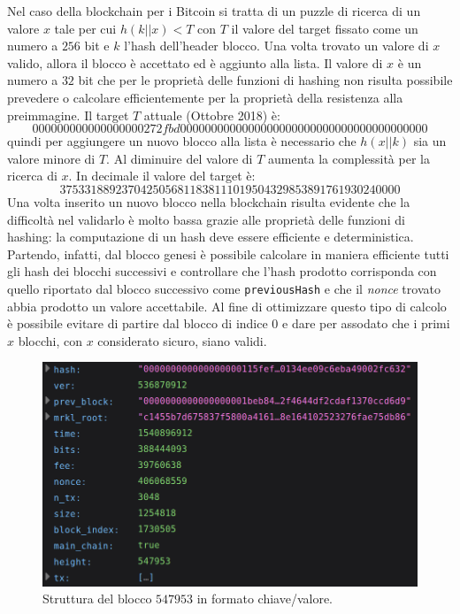 \begin{enumerate}[1.]
Nel caso della blockchain per i Bitcoin si tratta di un puzzle di ricerca di un valore $x$ tale per cui $h(k||x)<T$ con $T$ il valore del target fissato come un numero a $256$ bit e $k$ l'hash dell'header blocco.\newline
Una volta trovato un valore di $x$ valido, allora il blocco è accettato ed è aggiunto alla lista. Il valore di $x$ è un numero a $32$ bit che per le proprietà delle funzioni di hashing non risulta possibile prevedere o calcolare efficientemente per la proprietà della resistenza alla preimmagine.\newline
Il target $T$ attuale (Ottobre 2018) è:
\begin{equation}
    000000000000000000272fbd0000000000000000000000000000000000000000
\end{equation}
quindi per aggiungere un nuovo blocco alla lista è necessario che $h(x||k)$ sia un valore minore di $T$. Al diminuire del valore di $T$ aumenta la complessità per la ricerca di $x$.\newline
In decimale il valore del target è:
\begin{equation}
    3753318892370425056811838111019504329853891761930240000
\end{equation}
Una volta inserito un nuovo blocco nella blockchain risulta evidente che la difficoltà nel validarlo è molto bassa grazie alle proprietà delle funzioni di hashing: la computazione di un hash deve essere efficiente e deterministica.\newline
Partendo, infatti, dal blocco genesi è possibile calcolare in maniera efficiente tutti gli hash dei blocchi successivi e controllare che l'hash prodotto corrisponda con quello riportato dal blocco successivo come \texttt{previousHash} e che il \textit{nonce} trovato abbia prodotto un valore accettabile.\newline
Al fine di ottimizzare questo tipo di calcolo è possibile evitare di partire dal blocco di indice $0$ e dare per assodato che i primi $x$ blocchi, con $x$ considerato sicuro, siano validi.
\begin{figure}[H]
    \centering
    \includegraphics[width=\textwidth]{images/block.png}
    \caption{Struttura del blocco $547953$ in formato chiave/valore.}
\end{figure}


\end{enumerate}
